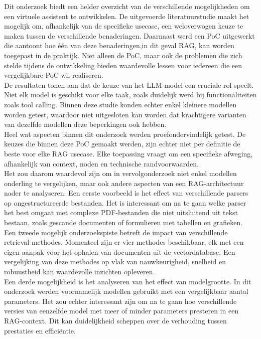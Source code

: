 Dit onderzoek biedt een helder overzicht van de verschillende mogelijkheden om een virtuele assistent te ontwikkelen. De uitgevoerde literatuurstudie maakt het mogelijk om, afhankelijk van de specifieke usecase, een weloverwogen keuze te maken tussen de verschillende benaderingen. Daarnaast werd een PoC uitgewerkt die aantoont hoe één van deze benaderingen,in dit geval RAG, kan worden toegepast in de praktijk. Niet alleen de PoC, maar ook de problemen die zich stelde tijdens de ontwikkeling bieden waardevolle lessen voor iedereen die een vergelijkbare PoC wil realiseren.
\\[1em]
De resultaten tonen aan dat de keuze van het LLM-model een cruciale rol speelt. Niet elk model is geschikt voor elke taak, zoals duidelijk werd bij functionaliteiten zoals tool calling. Binnen deze studie konden echter enkel kleinere modellen worden getest, waardoor niet uitgesloten kan worden dat krachtigere varianten van dezelfde modellen deze beperkingen ook hebben.
\\[1em]
Heel wat aspecten binnen dit onderzoek werden proefondervindelijk getest. De keuzes die binnen deze PoC gemaakt werden, zijn echter niet per definitie de beste voor elke RAG usecase. Elke toepassing vraagt om een specifieke afweging, afhankelijk van context, noden en technische randvoorwaarden.
\\[1em]
Het zou daarom waardevol zijn om in vervolgonderzoek niet enkel modellen onderling te vergelijken, maar ook andere aspecten van een RAG-architectuur nader te analyseren. Een eerste voorbeeld is het effect van verschillende parsers op ongestructureerde bestanden. Het is interessant om na te gaan welke parser het best omgaat met complexe PDF-bestanden die niet uitsluitend uit tekst bestaan, zoals gescande documenten of formulieren met tabellen en grafieken.
\\[1em]
Een tweede mogelijk onderzoekspiste betreft de impact van verschillende retrieval-methodes. Momenteel zijn er vier methodes beschikbaar, elk met een eigen aanpak voor het ophalen van documenten uit de vectordatabase. Een vergelijking van deze methodes op vlak van nauwkeurigheid, snelheid en robuustheid kan waardevolle inzichten opleveren.
\\[1em]
Een derde mogelijkheid is het analyseren van het effect van modelgrootte. In dit onderzoek werden voornamelijk modellen gebruikt met een vergelijkbaar aantal parameters. Het zou echter interessant zijn om na te gaan hoe verschillende versies van eenzelfde model met meer of minder parameters presteren in een RAG-context. Dit kan duidelijkheid scheppen over de verhouding tussen prestaties en efficiëntie.
